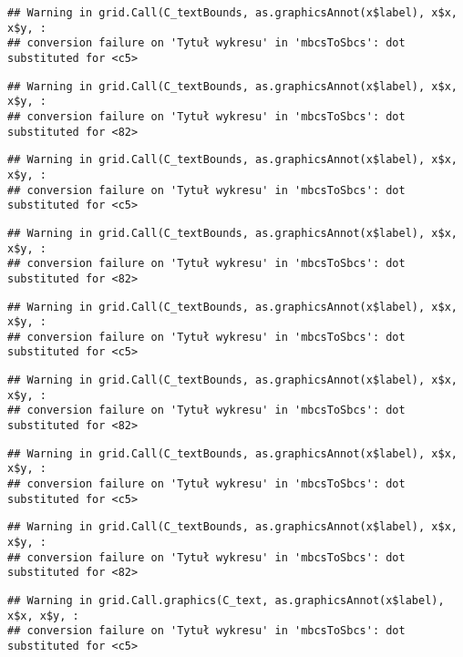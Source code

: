 \documentclass[
]{book}
\begin{document}
\begin{verbatim}
## Warning in grid.Call(C_textBounds, as.graphicsAnnot(x$label), x$x, x$y, :
## conversion failure on 'Tytuł wykresu' in 'mbcsToSbcs': dot substituted for <c5>
\end{verbatim}

\begin{verbatim}
## Warning in grid.Call(C_textBounds, as.graphicsAnnot(x$label), x$x, x$y, :
## conversion failure on 'Tytuł wykresu' in 'mbcsToSbcs': dot substituted for <82>
\end{verbatim}

\begin{verbatim}
## Warning in grid.Call(C_textBounds, as.graphicsAnnot(x$label), x$x, x$y, :
## conversion failure on 'Tytuł wykresu' in 'mbcsToSbcs': dot substituted for <c5>
\end{verbatim}

\begin{verbatim}
## Warning in grid.Call(C_textBounds, as.graphicsAnnot(x$label), x$x, x$y, :
## conversion failure on 'Tytuł wykresu' in 'mbcsToSbcs': dot substituted for <82>
\end{verbatim}

\begin{verbatim}
## Warning in grid.Call(C_textBounds, as.graphicsAnnot(x$label), x$x, x$y, :
## conversion failure on 'Tytuł wykresu' in 'mbcsToSbcs': dot substituted for <c5>
\end{verbatim}

\begin{verbatim}
## Warning in grid.Call(C_textBounds, as.graphicsAnnot(x$label), x$x, x$y, :
## conversion failure on 'Tytuł wykresu' in 'mbcsToSbcs': dot substituted for <82>
\end{verbatim}

\begin{verbatim}
## Warning in grid.Call(C_textBounds, as.graphicsAnnot(x$label), x$x, x$y, :
## conversion failure on 'Tytuł wykresu' in 'mbcsToSbcs': dot substituted for <c5>
\end{verbatim}

\begin{verbatim}
## Warning in grid.Call(C_textBounds, as.graphicsAnnot(x$label), x$x, x$y, :
## conversion failure on 'Tytuł wykresu' in 'mbcsToSbcs': dot substituted for <82>
\end{verbatim}

\begin{verbatim}
## Warning in grid.Call.graphics(C_text, as.graphicsAnnot(x$label), x$x, x$y, :
## conversion failure on 'Tytuł wykresu' in 'mbcsToSbcs': dot substituted for <c5>
\end{verbatim}
\end{document}
